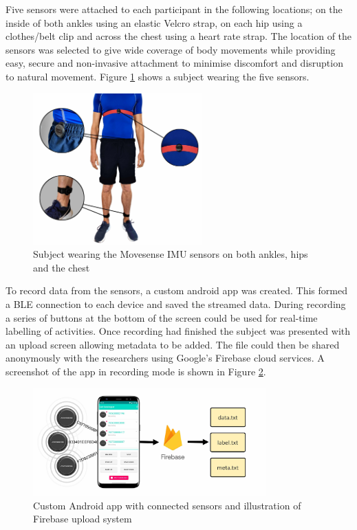 \documentclass[sensors,article,submit,moreauthors,pdftex]{Definitions/mdpi}
\begin{document}
Five sensors were attached to each participant in the following locations; on the inside of both ankles using an elastic Velcro strap, on each hip using a clothes/belt clip and across the chest using a heart rate strap. The location of the sensors was selected to give wide coverage of body movements while providing easy, secure and non-invasive attachment to minimise discomfort and disruption to natural movement. Figure \ref{fig:movesense_sensors} shows a subject wearing the five sensors.

\begin{figure}[!hbt]
    \centering
    \includegraphics[height=220px]{Figures/movesense/sensor_locations.jpg}
    \caption{Subject wearing the Movesense IMU sensors on both ankles, hips and the chest}
    \label{fig:movesense_sensors}
\end{figure}

To record data from the sensors, a custom android app was created. This formed a BLE connection to each device and saved the streamed data. During recording a series of buttons at the bottom of the screen could be used for real-time labelling of activities. Once recording had finished the subject was presented with an upload screen allowing metadata to be added. The file could then be shared anonymously with the researchers using Google's Firebase cloud services. A screenshot of the app in recording mode is shown in Figure \ref{fig:data_collection_diagrams}.

\begin{figure}[!hbt]
    \centering
    \includegraphics[width=0.8\textwidth]{Figures/movesense/sensor_collection.jpg}
    \caption{Custom Android app with connected sensors and illustration of Firebase upload system}
    \label{subfig:data_collection}
    \label{fig:data_collection_diagrams}
\end{figure}
\end{document}
